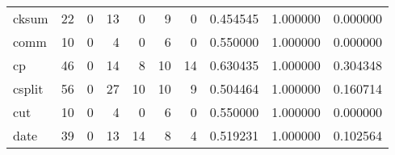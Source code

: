 \begin{longtable}{lrrrrrrrrr}
cksum     &                                       22 &                                                  0 &                                                 13 &                                                  0 &                                                  9 &                                                  0 &                                           0.454545 &                               1.000000 &                             0.000000 \\
comm      &                                       10 &                                                  0 &                                                  4 &                                                  0 &                                                  6 &                                                  0 &                                           0.550000 &                               1.000000 &                             0.000000 \\
cp        &                                       46 &                                                  0 &                                                 14 &                                                  8 &                                                 10 &                                                 14 &                                           0.630435 &                               1.000000 &                             0.304348 \\
csplit    &                                       56 &                                                  0 &                                                 27 &                                                 10 &                                                 10 &                                                  9 &                                           0.504464 &                               1.000000 &                             0.160714 \\
cut       &                                       10 &                                                  0 &                                                  4 &                                                  0 &                                                  6 &                                                  0 &                                           0.550000 &                               1.000000 &                             0.000000 \\
date      &                                       39 &                                                  0 &                                                 13 &                                                 14 &                                                  8 &                                                  4 &                                           0.519231 &                               1.000000 &                             0.102564 \\

\end{longtable}
